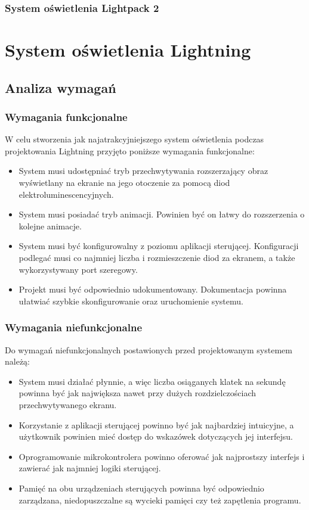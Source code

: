 \documentclass[12pt]{report}
\begin{document}
\subsection{System oświetlenia Lightpack 2}


\chapter{System oświetlenia Lightning}

\section{Analiza wymagań}

\subsection{Wymagania funkcjonalne}

W celu stworzenia jak najatrakcyjniejszego system oświetlenia podczas projektowania Lightning przyjęto poniższe wymagania funkcjonalne:

\begin{itemize}
\item System musi udostępniać tryb przechwytywania rozszerzający obraz wyświetlany na ekranie na jego otoczenie za pomocą diod elektroluminescencyjnych.
\item System musi posiadać tryb animacji. Powinien być on łatwy do rozszerzenia o kolejne animacje.
\item System musi być konfigurowalny z poziomu aplikacji sterującej. Konfiguracji podlegać musi co najmniej liczba i rozmieszczenie diod za ekranem, a także wykorzystywany port szeregowy.
\item Projekt musi być odpowiednio udokumentowany. Dokumentacja powinna ułatwiać szybkie skonfigurowanie oraz uruchomienie systemu.
\end{itemize}

\subsection{Wymagania niefunkcjonalne}

Do wymagań niefunkcjonalnych postawionych przed projektowanym systemem należą:

\begin{itemize}
\item System musi działać płynnie, a więc liczba osiąganych klatek na sekundę powinna być jak największa nawet przy dużych rozdzielczościach przechwytywanego ekranu.
\item Korzystanie z aplikacji sterującej powinno być jak najbardziej intuicyjne, a użytkownik powinien mieć dostęp do wskazówek dotyczących jej interfejsu.
\item Oprogramowanie mikrokontrolera powinno oferować jak najprostszy interfejs i zawierać jak najmniej logiki sterującej.
\item Pamięć na obu urządzeniach sterujących powinna być odpowiednio zarządzana, niedopuszczalne są wycieki pamięci czy też zapętlenia programu.
\end{itemize}
\end{document}
